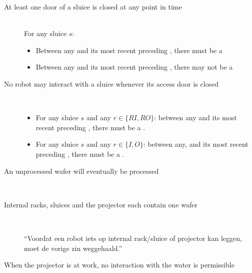 
\begin{description}
 \item[At least one door of a sluice is closed at any point in time] \hfill \\
 For any sluice $s$:
 \begin{itemize}
  \item Between any  and its most recent preceding , there must be a 
  \item Between any  and its most recent preceding , there may not be a 
 \end{itemize}

 \item[No robot may interact with a sluice whenever its access door is closed] \hfill \\
\begin{itemize}
	\item For any sluice $s$ and any $r \in \{ RI, RO \}$: between any  and its most recent preceding , there must be a .
	\item For any sluice $s$ and any $r \in \{ I, O \}$: between any, and its most recent preceding , there must be a .
\end{itemize}
 
 \item[An unprocessed wafer will eventually be processed] \hfill \\
 
 
 
 \item[Internal racks, sluices and the projector each contain one wafer] \hfill \\
 
 ``Voordat een robot iets op internal rack/sluice of projector kan leggen, moet de vorige zin weggehaald.''
 
 \item[When the projector is at work, no interaction with the water is permissible] \hfill \\
 
 

\end{description}
